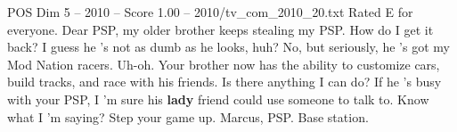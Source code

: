\begin{textsample}{POS Dim 5 – 2010 – Score 1.00 – 2010/tv\_com\_2010\_20.txt}  \label{ex:f5_pos_074}
Rated E for everyone.
Dear PSP, my older brother keeps stealing my PSP.
How do I get it back?
I guess he 's not as dumb as he looks, huh?
No, but seriously, he 's got my Mod Nation racers.
Uh-oh.
Your brother now has the ability to customize cars, build tracks, and race with his friends.
Is there anything I can do?
If he 's busy with your PSP, I 'm sure his \textbf{lady} friend could use someone to talk to.
Know what I 'm saying?
Step your game up.
Marcus, PSP.
Base station.

\end{textsample}
